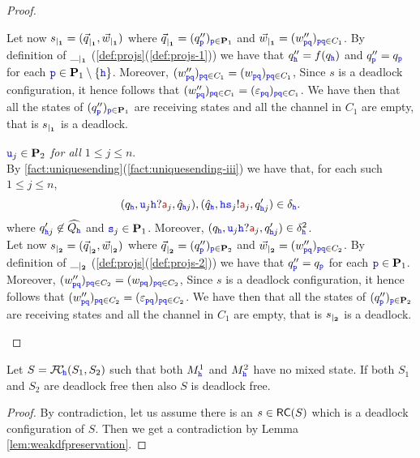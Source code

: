 \begin{proof}
\begin{description}
\begin{description}
Let now $\restrict{s}{1}=(\restrict{\vec{q}}{1},\restrict{\vec{w}}{1})$
where $\restrict{\vec{q}}{1} = (q''_\ttp)_{\ttp\in\roles_1}$
and $\restrict{\vec{w}}{1} = (w''_{\ttp\ttq})_{\ttp\ttq\in C_1}$.
By definition of $\restrict{\_}{1}$ (\cref{def:projs}(\ref{def:projs-1}))
we have that $q''_\hh = f(q_\hh)$ and $q''_\ttp = q_\ttp$ for each $\ttp\in\roles_1\setminus\Set{\hh}$.
Moreover, $(w''_{\ttp\ttq})_{\ttp\ttq\in C_1} =  (w_{\ttp\ttq})_{\ttp\ttq\in C_1}$,
Since $s$ is a deadlock configuration, it hence follows that  $(w''_{\ttp\ttq})_{\ttp\ttq\in C_1} =  (\varepsilon_{\ttp\ttq})_{\ttp\ttq\in C_1}$.
We have then that all the states of $(q''_\ttp)_{\ttp\in\roles_1}$ are receiving states
and all the channel in $C_1$ are empty, that is $\restrict{s}{1}$ is a deadlock.
%
\item 
{\em $\ttu_j \in \roles_2$ for all $1\leq j\leq n$}.\\
By \cref{fact:uniquesending}(\ref{fact:uniquesending-iii}) we have that, for each such $1\leq j\leq n$,  
$$(q_{\HH},\ttu_j{\HH}?\msg[a]_j,\hat{q}_{\hh j}),(\hat{q}_\hh,\HH{\tts_j}!\msg[a]_j,q'_{\HH j})\in \delta_{\HH}.$$
where $q'_{\HH j}\not\in\widehat{Q_\hh}$ and $\tts_j\in\roles_1$. 
Moreover, $(q_\HH,\ttu_j\HH?\msg[a]_j,q'_{\HH j})\in\delta^2_\HH$.\\
Let now $\restrict{s}{2}=(\restrict{\vec{q}}{2},\restrict{\vec{w}}{2})$
where $\restrict{\vec{q}}{2} = (q''_\ttp)_{\ttp\in\roles_2}$
and $\restrict{\vec{w}}{2} = (w''_{\ttp\ttq})_{\ttp\ttq\in C_2}$.
By definition of $\restrict{\_}{2}$ (\cref{def:projs}(\ref{def:projs-2}))
we have that $q''_\ttp = q_\ttp$ for each $\ttp\in\roles_1$.
Moreover, $(w''_{\ttp\ttq})_{\ttp\ttq\in C_2} =  (w_{\ttp\ttq})_{\ttp\ttq\in C_2}$,
Since $s$ is a deadlock configuration, it hence follows that  $(w''_{\ttp\ttq})_{\ttp\ttq\in C_2} =  (\varepsilon_{\ttp\ttq})_{\ttp\ttq\in C_2}$.
We have then that all the states of $(q''_\ttp)_{\ttp\in\roles_2}$ are receiving states
and all the channel in $C_1$ are empty, that is $\restrict{s}{2}$ is a deadlock.
\end{description}
 \end{description}
 \end{proof}

\begin{corollary}%
\label{prop:weakdfPreservation}
Let $S = \fusioncomp_{\!\hh}(S_1,S_2)$ such that
both $M^1_\hh$ and $M^2_\hh$ have no mixed state.
If both $S_1$ and $S_2$ are deadlock free then also $S$ is deadlock free.
\end{corollary}
\begin{proof}
By contradiction, let us assume there is an $s\in \RS(S)$ which is a deadlock configuration of $S$. Then we get a contradiction by Lemma \ref{lem:weakdfpreservation}.
\end{proof}



